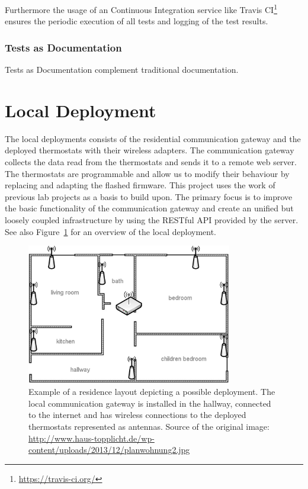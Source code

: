 Furthermore the usage of an Continuous Integration service like Travis CI\footnote{\url{https://travis-ci.org/}} ensures the periodic execution of all tests and logging of the test results.

\subsubsection{Tests as Documentation}

Tests as Documentation complement traditional documentation.


\section{Local Deployment}
\label{sec:local_infrastructure}

The local deployments consists of the residential communication gateway and the deployed thermostats with their wireless adapters. The communication gateway collects the data read from the thermostats and sends it to a remote web server. The thermostats are programmable and allow us to modify their behaviour by replacing and adapting the flashed firmware. This project uses the work of previous lab projects as a basis to build upon. The primary focus is to improve the basic functionality of the communication gateway and create an unified but loosely coupled infrastructure by using the RESTful API provided by the server.
See also Figure~\ref{fig:residence_layout} for an overview of the local deployment.

\begin{figure}[h]
\begin{center}
\includegraphics[width=0.8\textwidth]{images/residence_layout_schema.png}
\end{center}
\caption{Example of a residence layout depicting a possible deployment. The local communication gateway is installed in the hallway, connected to the internet and has wireless connections to the deployed thermostats represented as antennas. Source of the original image: \url{http://www.haus-topplicht.de/wp-content/uploads/2013/12/planwohnung2.jpg}}
\label{fig:residence_layout}
\end{figure}

